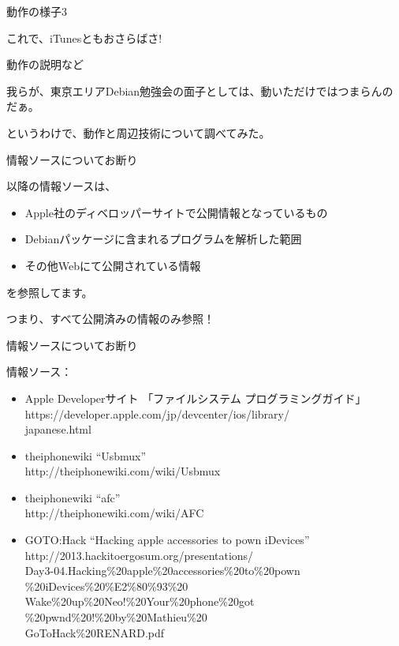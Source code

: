 \begin{frame}[containsverbatim]{動作の様子3}

 \begin{center}
 \LARGE これで、iTunesともおさらばさ!
 \end{center}

\end{frame}

\begin{frame}{動作の説明など}

 我らが、東京エリアDebian勉強会の面子としては、動いただけではつまらんのだぁ。
\begin{center} 
\LARGE
というわけで、動作と周辺技術について調べてみた。
\end{center}

\end{frame}

\begin{frame}{情報ソースについてお断り}

以降の情報ソースは、

\begin{itemize}
\item Apple社のディベロッパーサイトで公開情報となっているもの
\item Debianパッケージに含まれるプログラムを解析した範囲
\item その他Webにて公開されている情報
\end{itemize}

を参照してます。\\
\begin{center}
\LARGE つまり、すべて公開済みの情報のみ参照！
\end{center}

\end{frame}

\begin{frame}{情報ソースについてお断り}

情報ソース：

\begin{itemize}
\item Apple Developerサイト 「ファイルシステム プログラミングガイド」\\
https://developer.apple.com/jp/devcenter/ios/library/\\
japanese.html
\item theiphonewiki ``Usbmux'' \\
http://theiphonewiki.com/wiki/Usbmux
\item theiphonewiki ``afc'' \\
http://theiphonewiki.com/wiki/AFC
\item GOTO:Hack ``Hacking apple accessories to pown iDevices''
http://2013.hackitoergosum.org/presentations/\\
Day3-04.Hacking\%20apple\%20accessories\%20to\%20pown\\
\%20iDevices\%20\%E2\%80\%93\%20\\
Wake\%20up\%20Neo!\%20Your\%20phone\%20got\\
\%20pwnd\%20!\%20by\%20Mathieu\%20\\
GoToHack\%20RENARD.pdf
\end{itemize}

\end{frame}

